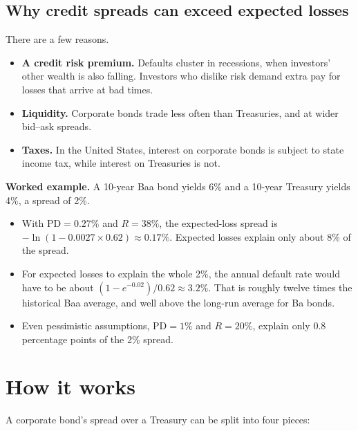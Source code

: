 \subsection{Why credit spreads can exceed expected losses}

There are a few reasons.

\begin{itemize}
  \item \textbf{A credit risk premium.} Defaults cluster in recessions, when investors' other wealth is also falling. Investors who dislike risk demand extra pay for losses that arrive at bad times.
  \item \textbf{Liquidity.} Corporate bonds trade less often than Treasuries, and at wider bid--ask spreads.
  \item \textbf{Taxes.} In the United States, interest on corporate bonds is subject to state income tax, while interest on Treasuries is not.
\end{itemize}

\textbf{Worked example.} A 10-year Baa bond yields 6\% and a 10-year Treasury yields 4\%, a spread of 2\%.

\begin{itemize}
  \item With $\mathrm{PD} = 0.27\%$ and $R = 38\%$, the expected-loss spread is $-\ln(1 - 0.0027 \times 0.62) \approx 0.17\%$. Expected losses explain only about 8\% of the spread.
  \item For expected losses to explain the whole 2\%, the annual default rate would have to be about $(1 - e^{-0.02})/0.62 \approx 3.2\%$. That is roughly twelve times the historical Baa average, and well above the long-run average for Ba bonds.
  \item Even pessimistic assumptions, $\mathrm{PD} = 1\%$ and $R = 20\%$, explain only 0.8 percentage points of the 2\% spread.
\end{itemize}


\section{How it works}
\label{sec:15-how}

A corporate bond's spread over a Treasury can be split into four pieces:

